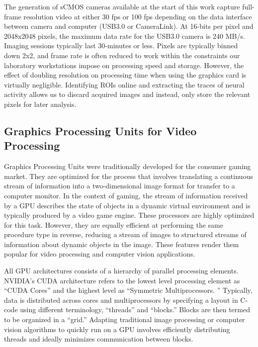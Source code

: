 The generation of sCMOS cameras available at the start of this work capture full-frame resolution video at either 30 fps or 100 fps depending on the data interface between camera and computer (USB3.0 or CameraLink).
At 16-bits per pixel and 2048x2048 pixels, the maximum data rate for the USB3.0 camera is 240 MB/s.
Imaging sessions typically last 30-minutes or less.
Pixels are typically binned down 2x2, and frame rate is often reduced to work within the constraints our laboratory workstations impose on processing speed and storage.
However, the effect of doubling resolution on processing time when using the graphics card is virtually negligible.
Identifying ROIs online and extracting the traces of neural activity allows us to discard acquired images and instead, only store the relevant pixels for later analysis.

\subsection{
	Graphics Processing Units for Video Processing}\label{graphics-processing-units-for-video-processing} 

Graphics Processing Units were traditionally developed for the consumer gaming market.
They are optimized for the process that involves translating a continuous stream of information into a two-dimensional image format for transfer to a computer monitor.
In the context of gaming, the stream of information received by a GPU describes the state of objects in a dynamic virtual environment and is typically produced by a video game engine.
These processors are highly optimized for this task.
However, they are equally efficient at performing the same procedure type in reverse, reducing a stream of images to structured streams of information about dynamic objects in the image.
These features render them popular for video processing and computer vision applications.

All GPU architectures consists of a hierarchy of parallel processing elements.
NVIDIA's CUDA architecture refers to the lowest level processing element as ``CUDA Cores'' and the highest level as ``Symmetric Multiprocessors.
'' Typically, data is distributed across
cores and multiprocessors by specifying a layout in C-code using
different terminology, ``threads'' and ``blocks.'' Blocks are then
termed to be organized in a ``grid.'' Adapting traditional image
processing or computer vision algorithms to quickly run on a GPU
involves efficiently distributing threads and ideally minimizes
communication between blocks.

